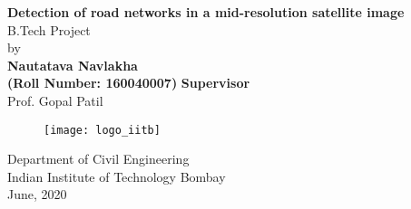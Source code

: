 \begin{titlepage}
  \vspace{3 cm}
  \begin{center}
  \large{\textbf{Detection of road networks in a mid-resolution satellite image}}\bigskip \\
  
  \vspace{3mm}
  \vfill
  B.Tech Project \\
  by \bigskip \\
  \textbf{Nautatava Navlakha\\(Roll Number: 160040007)}
  \vfill
  \textbf{Supervisor}\\
  Prof. Gopal Patil\\
\vfill  \begin{figure}[h]
  \texttt{[image: logo\_iitb]}
  \centering
  \end{figure}
  \vfill
  \large
  
Department of Civil Engineering\\
Indian Institute of Technology Bombay\\
June, 2020
\end{center}
\vfill %
\end{titlepage}
